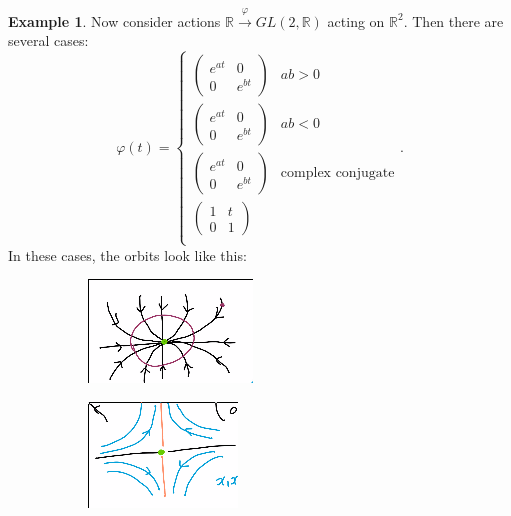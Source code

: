 \documentclass[leqno, openany]{memoir}
\theoremstyle{definition}
\newtheorem{exm}[thm]{Example}
\theoremstyle{remark}
\theoremstyle{plain}
\theoremstyle{definition}
\theoremstyle{remark}
\newcommand{\R}{\mathbb{R}}
\begin{document}
\begin{exm}
    Now consider actions $\R \xrightarrow{\varphi} GL(2,\R)$ acting on $\R^2$. Then there are several cases:
    \[ \varphi(t) = \begin{cases}
        \begin{pmatrix}
            e^{at} & 0 \\ 0 & e^{bt}
        \end{pmatrix} & ab > 0 \\
        \begin{pmatrix}
            e^{at} & 0 \\ 0 & e^{bt}
        \end{pmatrix} & ab < 0 \\
        \begin{pmatrix}
            e^{at} & 0 \\ 0 & e^{bt}
        \end{pmatrix} & \text{complex conjugate} \\
        \begin{pmatrix}
            1 & t \\ 0 & 1
        \end{pmatrix} &  \\
    \end{cases}. \]
    In these cases, the orbits look like this:
    \begin{figure}[H]
        \centering
        \begin{subfigure}[b]{0.2\textwidth}
        \begin{center}
            \includegraphics[scale=0.6]{orbits1.png}
        \end{center}
        \caption{}
        \label{fig:}
        \end{subfigure}
        \begin{subfigure}[b]{0.2\textwidth}
        \begin{center}
            \includegraphics[scale=0.6]{orbits2.png}

\end{center}
\end{subfigure}
\end{figure}
\end{exm}
\end{document}
